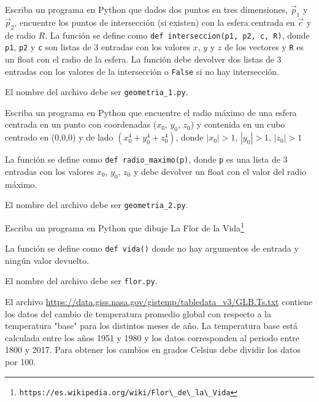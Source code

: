 \documentclass[11pt,letterpaper]{exam}
\begin{document}
\vspace{0.3cm}
\begin{questions}


Escriba un programa en Python que dados dos puntos en tres
dimensiones, $\vec{p}_1$ y $\vec{p}_2$, encuentre los puntos de
intersecci\'on (si existen) con la esfera centrada en $\vec{c}$ y de
radio $R$.  
La funci\'on se define como  \verb"def interseccion(p1, p2, c, R)",
donde \verb"p1", \verb"p2" y \verb"c" son listas de 3 entradas con los
valores $x$, $y$ y $z$ de los vectores y \verb"R" es un float con el
radio de la esfera.  
La funci\'on debe devolver dos listas de 3 entradas con los valores de
la intersecci\'on o \verb"False" si no hay intersecci\'on.  

El nombre del archivo debe ser \verb"geometria_1.py".


Escriba un programa en Python que encuentre el radio máximo de una
esfera centrada en un punto con coordenadas
($x_0$, $y_0$, $z_0$) y contenida en un cubo centrado en (0,0,0) y de
lado $(x_0^4+y_0^4+z_0^4)$, donde $|x_0|>1$, $|y_0|>1$, $|z_0|>1$

La funci\'on se define como  \verb"def radio_maximo(p)", donde
\verb"p" es una lista de 3 entradas con los valores $x_0$, $y_0$,
$z_0$ y debe devolver un float con el valor del radio m\'aximo.

El nombre del archivo debe ser \verb"geometria_2.py".


Escriba un programa en Python que dibuje La Flor de la Vida\footnote{\verb"https://es.wikipedia.org/wiki/Flor\_de\_la\_Vida"}

La funci\'on se define como  \verb"def vida()" donde no hay argumentos
de entrada y ning\'un valor devuelto.

El nombre del archivo debe ser \verb"flor.py".


El archivo \url{https://data.giss.nasa.gov/gistemp/tabledata_v3/GLB.Ts.txt}
 contiene los datos del cambio de temperatura promedio global con
respecto a la temperatura "base" para los distintos meses de año. La
temperatura base está calculada entre los años 1951 y 1980 y los datos
corresponden al periodo entre 1800 y 2017. Para obtener los cambios en
grados Celsius debe dividir los datos por 100.


\end{questions}
\end{document}
